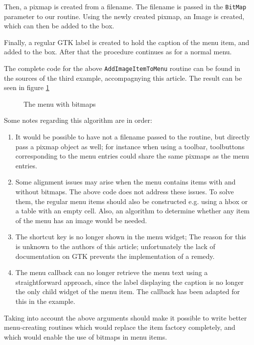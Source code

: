 \documentclass[10pt]{article}
\begin{document}
Then, a pixmap is created from a filename. The filename is passed in the 
\lstinline|BitMap| parameter to our routine. Using the newly created pixmap,
an Image is created, which can then be added to the box.

Finally, a regular GTK label is created to hold the caption of the menu
item, and added to the box. After that the procedure continues as for a
normal menu.

The complete code for the above \lstinline|AddImageItemToMenu| routine can
be found in the sources of the third example, accompagnying this article.
The result can be seen in figure \ref{fig:pixmenu}
\begin{figure}[ht]
\caption{The menu with bitmaps}\label{fig:pixmenu}
\end{figure}

Some notes regarding this algorithm are in order:
\begin{enumerate}
\item It would be possible to have not a filename passed to the routine, but
directly pass a pixmap object as well; for instance when using a toolbar,
toolbuttons corresponding to the menu entries could share the same pixmaps
as the menu entries.
\item Some alignment issues may arise when the menu contains items with and
without bitmaps. The above code does not address these issues. To solve
them, the regular menu items should also be constructed e.g. using a hbox or a
table with an empty cell. Also, an algorithm to determine whether any item of
the menu has an image would be needed.
\item The shortcut key is no longer shown in the menu widget; The reason for
this is unknown to the authors of this article; unfortunately the lack of
documentation on GTK prevents the implementation of a remedy.
\item The menu callback can no longer retrieve the menu text using a
straightforward approach, since the label displaying the caption is 
no longer the only child widget of the menu item. The callback has been
adapted for this in the example.
\end{enumerate}
Taking into account the above arguments should make it possible to write
better menu-creating routines which would replace the item factory
completely, and which would enable the use of bitmaps in menu items.
\end{document}
